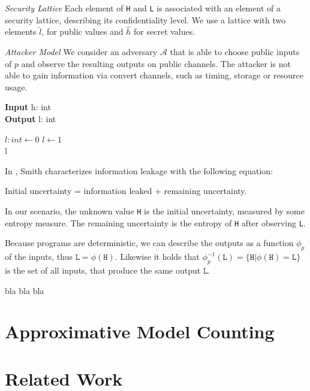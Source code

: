\emph{Security Lattice} Each element of \texttt{H} and \texttt{L} is associated with an element of a security lattice, describing its confidentiality level. We use a lattice with two elements $\hat{l}$, for public values and $\hat{h}$ for secret values.

\emph{Attacker Model} We consider an adversary $\mathcal{A}$ that is able to choose public inputs of $p$ and observe the resulting outputs on public channels. The attacker is not able to gain information via convert channels, such as timing, storage or resource usage.


\begin{algorithm}
	\caption{} %
    \hspace*{\algorithmicindent} \textbf{Input} h: int \\
    \hspace*{\algorithmicindent} \textbf{Output} l: int
	\begin{algorithmic}[1]
        \State $l: int \leftarrow 0$
        \State $l \leftarrow 1$
        \EndIf\\
        \Return l
	\end{algorithmic} 
\end{algorithm}

In \cite{smith09}, Smith characterizes information leakage with the following equation:
\begin{center}
    Initial uncertainty = information leaked + remaining uncertainty.
\end{center}
In our scenario, the unknown value \texttt{H} is the initial uncertainty, measured by some entropy measure. The remaining uncertainty is the entropy of \texttt{H} after observing \texttt{L}. 


Because programs are deterministic, we can describe the outputs as a function $\phi_p$ of the inputs, thus $\mathtt{L} = \phi(\mathtt{H})$. Likewise it holds that $\phi_p^{-1}(\mathtt{L}) = \{ \mathtt{H} | \phi(\mathtt{H}) = \mathtt{L} \}$ is the set of all inputs, that produce the same output $\mathtt{L}$.

\begin{definition}
        bla bla bla
\end{definition}


\section{Approximative Model Counting}

\section{Related Work}
